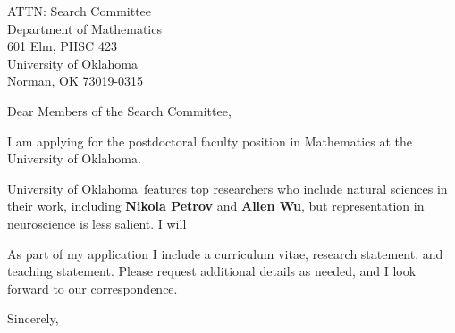 \documentclass[11pt,a4paper]{letter}
\begin{document}

\def\School{University of Oklahoma}
\begin{letter}
{ATTN: Search Committee\\
Department of Mathematics\\
601 Elm, PHSC 423\\
University of Oklahoma\\
Norman, OK 73019-0315}


\opening{Dear Members of the Search Committee,}

I am applying for the postdoctoral faculty position in Mathematics at the \School. 



\School~features top researchers who include natural sciences in their work, including \textbf{Nikola Petrov} and \textbf{Allen Wu}, but representation in neuroscience is less salient. I will 



As part of my application I include a curriculum vitae, research statement, and teaching statement. Please request additional details as needed, and I look forward to our correspondence.

\closing{Sincerely,}
\end{letter}
\end{document}

